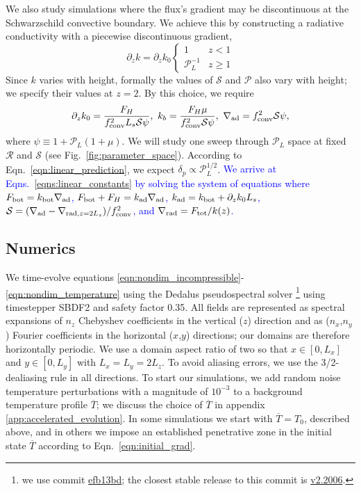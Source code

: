 \documentclass[twocolumn, linenumbers]{aastex631}
\newcommand{\gradrad}{\ensuremath{\nabla_{\rm{rad}}}}
\newcommand{\gradad}{\ensuremath{\nabla_{\rm{ad}}}}
\newcommand{\justgrad}{\ensuremath{\nabla}}
\newcommand{\mP}{\ensuremath{\mathcal{P}}}
\newcommand{\mR}{\ensuremath{\mathcal{R}}}
\newcommand{\mS}{\ensuremath{\mathcal{S}}}
\renewcommand{\bar}[1]{\overline{#1}}
\newcommand{\edittwo}[1]{\textcolor{blue}{#1}}
\begin{document}
We also study simulations where the flux's gradient may be discontinuous at the Schwarzschild convective boundary.
We achieve this by constructing a radiative conductivity with a piecewise discontinuous gradient,
\begin{equation}
\partial_z k = \partial_z k_0
\begin{cases}
1	&	z < 1 \\
\mP_L^{-1} &	z \geq 1
\end{cases}
\label{eqn:sim_linear_k}
\end{equation}
Since $k$ varies with height, formally the values of $\mS$ and $\mP$ also vary with height; we specify their values at $z = 2$.
By this choice, we require
\begin{equation}
\partial_z k_0 = \frac{F_{H}}{f_{\rm{conv}}^2L_s \mS \psi},\,\,
k_b = \frac{F_H \mu}{f_{\rm{conv}}^2\mS\psi},\,\,
\gradad = f_{\rm{conv}}^2 \mS \psi,
    \label{eqns:linear_constants}
\end{equation}
where $\psi \equiv 1 + \mP_L(1 + \mu)$.
We will study one sweep through $\mP_L$ space at fixed $\mR$ and $\mS$ (see Fig.~\ref{fig:parameter_space}).
According to Eqn.~\ref{eqn:linear_prediction}, we expect $\delta_p \propto \mP_L^{1/2}$.
\edittwo{
    We arrive at Eqns.~\ref{eqns:linear_constants} by solving the system of equations where ${F_{\rm{bot}} = k_{\rm{bot}}\gradad}$, ${F_{\rm{bot}} + F_H = k_{\rm{ad}}\gradad}$, ${k_{\rm{ad}} = k_{\rm{bot}} + \partial_z k_0 L_s}$, ${\mS = (\gradad - \justgrad_{\mathrm{rad},z=2L_s})/f_{\rm{conv}}^2}$, and ${\gradrad = F_{\rm{tot}}/k(z)}$.
}

\subsection{Numerics}
\label{sct:numerics}
We time-evolve equations \ref{eqn:nondim_incompressible}-\ref{eqn:nondim_temperature} using the Dedalus pseudospectral solver \citep{burns_etal_2020}\footnote{we use commit \href{https://github.com/DedalusProject/dedalus/commit/efb13bdaa09816dde3eee897bc2a15fc284ea2f1}{efb13bd}; the closest stable release to this commit is \href{https://github.com/DedalusProject/dedalus/releases/tag/v2.2006}{v2.2006}.} using timestepper SBDF2 \citep{wang&ruuth2008} and safety factor 0.35.
All fields are represented as spectral expansions of $n_z$ Chebyshev coefficients in the vertical ($z$) direction and as ($n_x$,$n_y$) Fourier coefficients in the horizontal ($x$,$y$) directions; our domains are therefore horizontally periodic.
We use a domain aspect ratio of two so that $x \in [0, L_x]$ and $y \in [0, L_y]$ with $L_x = L_y = 2 L_z$.
To avoid aliasing errors, we use the 3/2-dealiasing rule in all directions.
To start our simulations, we add random noise temperature perturbations with a magnitude of $10^{-3}$ to a background temperature profile $\overline{T}$; we discuss the choice of $\overline{T}$ in appendix \ref{app:accelerated_evolution}.
In some simulations we start with $\bar{T} = T_0$, described above, and in others we impose an established penetrative zone in the initial state $\bar{T}$ according to Eqn.~\ref{eqn:initial_grad}.
\end{document}
